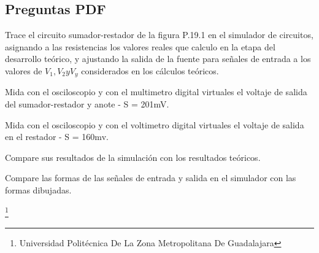 \documentclass[10pt,a4paper]{article}
\begin{document}
\subsection{Preguntas PDF}

Trace el circuito sumador-restador de la figura P.19.1 en el simulador de circuitos, asignando a las resistencias los valores reales que calculo en la etapa del desarrollo teórico, y  ajustando la salida de la fuente para señales de entrada a los valores de $V_1, V_2 y V_y$ considerados en los cálculos teóricos.

Mida con el osciloscopio y con el multimetro digital virtuales el voltaje de salida del sumador-restador y anote - S = 201mV.

Mida con el osciloscopio y con el voltimetro digital virtuales el voltaje de salida en el restador - S = 160mv.

Compare sus resultados de la simulación con los resultados teóricos.

Compare las formas de las señales de entrada y salida en el simulador con las formas dibujadas.

\footnote{Universidad Politécnica De La Zona Metropolitana De Guadalajara} 

\newpage
\end{document}
